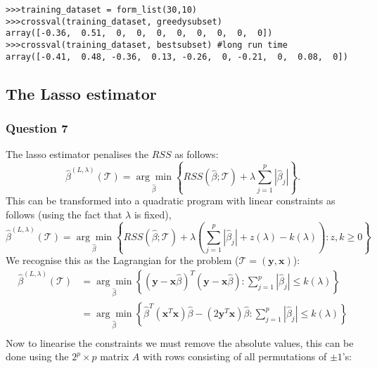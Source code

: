 \documentclass{article}
\begin{document}
\begin{lstlisting}
>>>training_dataset = form_list(30,10)
>>>crossval(training_dataset, greedysubset)
array([-0.36,  0.51,  0,  0,  0,  0,  0,  0,  0,  0])
>>>crossval(training_dataset, bestsubset) #long run time
array([-0.41,  0.48, -0.36,  0.13, -0.26,  0, -0.21,  0,  0.08,  0])
\end{lstlisting}

\subsection{The Lasso estimator}

\subsubsection{Question 7}
The lasso estimator penalises the $RSS$ as follows:
\begin{equation}
\hat{\beta}^{(L,\lambda)}(\mathcal{T})=\underset{\hat{\beta}}{\arg\min} \left \{ RSS \left (\hat{\beta};\mathcal{T} \right )+\lambda \sum_{j=1}^p \left | \hat{\beta}_j \right | \right \}.
\end{equation}
This can be transformed into a quadratic program with linear constraints as follows (using the fact that $\lambda$ is fixed),
\begin{equation*}
\hat{\beta}^{(L,\lambda)}(\mathcal{T}) = \underset{\hat{\beta}}{\arg\min} \left \{ RSS \left (\hat{\beta};\mathcal{T} \right )+\lambda \left ( \sum_{j=1}^p \left | \hat{\beta}_j \right | + z(\lambda) - k(\lambda) \right) : z,k \geq 0 \right \} 
\end{equation*}
We recognise this as the Lagrangian for the problem ($\mathcal{T}=(\textbf{y},\textbf{x})$):
\begin{equation*}
\begin{split}
\hat{\beta}^{(L,\lambda)}(\mathcal{T}) &= \underset{\hat{\beta}}{\arg\min} \left \{ (\textbf{y} - \textbf{x}\hat{\beta})^T (\textbf{y} - \textbf{x}\hat{\beta}) : \sum_{j=1}^p \left | \hat{\beta}_j \right | \leq k(\lambda) \right \} \\
&= \underset{\hat{\beta}}{\arg\min} \left \{ \hat{\beta}^T(\textbf{x}^T\textbf{x})\hat{\beta}-(2\textbf{y}^T\textbf{x})\hat{\beta} :\sum_{j=1}^p \left | \hat{\beta}_j \right | \leq k(\lambda) \right \} \\
\end{split}
\end{equation*}
Now to linearise the constraints we must remove the absolute values, this can be done using the $2^p \times p$ matrix $A$ with rows consisting of all permutations of $\pm 1$'s:
\end{document}
